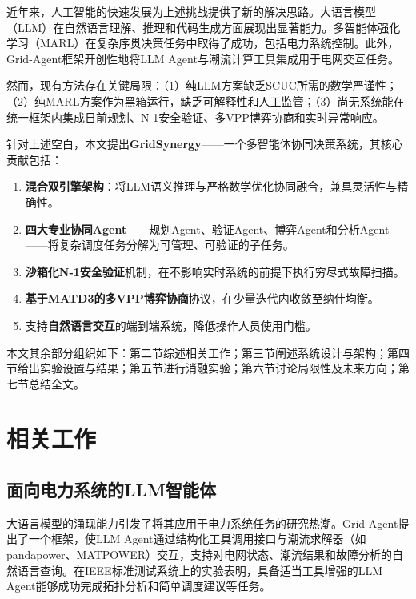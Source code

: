 \documentclass[conference]{IEEEtran}
\begin{document}
近年来，人工智能的快速发展为上述挑战提供了新的解决思路。大语言模型（LLM）在自然语言理解、推理和代码生成方面展现出显著能力\cite{llm_suc_2025}。多智能体强化学习（MARL）在复杂序贯决策任务中取得了成功，包括电力系统控制\cite{marl_grid_2026, madrl_vpp_2026}。此外，Grid-Agent框架\cite{grid_agent_2025}开创性地将LLM Agent与潮流计算工具集成用于电网交互任务。

然而，现有方法存在关键局限：（1）纯LLM方案缺乏SCUC所需的数学严谨性；（2）纯MARL方案作为黑箱运行，缺乏可解释性和人工监管；（3）尚无系统能在统一框架内集成日前规划、N-1安全验证、多VPP博弈协商和实时异常响应。

针对上述空白，本文提出\textbf{GridSynergy}——一个多智能体协同决策系统，其核心贡献包括：

\begin{enumerate}
    \item \textbf{混合双引擎架构}：将LLM语义推理与严格数学优化协同融合，兼具灵活性与精确性。
    \item \textbf{四大专业协同Agent}——规划Agent、验证Agent、博弈Agent和分析Agent——将复杂调度任务分解为可管理、可验证的子任务。
    \item \textbf{沙箱化N-1安全验证}机制，在不影响实时系统的前提下执行穷尽式故障扫描。
    \item \textbf{基于MATD3的多VPP博弈协商}协议，在少量迭代内收敛至纳什均衡。
    \item 支持\textbf{自然语言交互}的端到端系统，降低操作人员使用门槛。
\end{enumerate}

本文其余部分组织如下：第二节综述相关工作；第三节阐述系统设计与架构；第四节给出实验设置与结果；第五节进行消融实验；第六节讨论局限性及未来方向；第七节总结全文。

\section{相关工作}

\subsection{面向电力系统的LLM智能体}

大语言模型的涌现能力引发了将其应用于电力系统任务的研究热潮。Grid-Agent\cite{grid_agent_2025}提出了一个框架，使LLM Agent通过结构化工具调用接口与潮流求解器（如pandapower、MATPOWER）交互，支持对电网状态、潮流结果和故障分析的自然语言查询。在IEEE标准测试系统上的实验表明，具备适当工具增强的LLM Agent能够成功完成拓扑分析和简单调度建议等任务。
\end{document}
